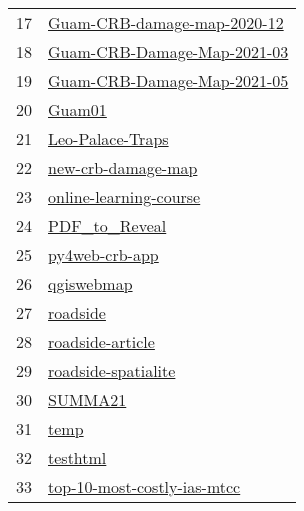 \begin{longtable}{rl}
17 &                   \href{https://github.com/aubreymoore/Guam-CRB-damage-map-2020-12}{Guam-CRB-damage-map-2020-12} \\
18 &                   \href{https://github.com/aubreymoore/Guam-CRB-Damage-Map-2021-03}{Guam-CRB-Damage-Map-2021-03} \\
19 &                   \href{https://github.com/aubreymoore/Guam-CRB-Damage-Map-2021-05}{Guam-CRB-Damage-Map-2021-05} \\
20 &                                                             \href{https://github.com/aubreymoore/Guam01}{Guam01} \\
21 &                                         \href{https://github.com/aubreymoore/Leo-Palace-Traps}{Leo-Palace-Traps} \\
22 &                                     \href{https://github.com/aubreymoore/new-crb-damage-map}{new-crb-damage-map} \\
23 &                             \href{https://github.com/aubreymoore/online-learning-course}{online-learning-course} \\
24 &                                               \href{https://github.com/aubreymoore/PDF_to_Reveal}{PDF_to_Reveal} \\
25 &                                             \href{https://github.com/aubreymoore/py4web-crb-app}{py4web-crb-app} \\
26 &                                                     \href{https://github.com/aubreymoore/qgiswebmap}{qgiswebmap} \\
27 &                                                         \href{https://github.com/aubreymoore/roadside}{roadside} \\
28 &                                         \href{https://github.com/aubreymoore/roadside-article}{roadside-article} \\
29 &                                   \href{https://github.com/aubreymoore/roadside-spatialite}{roadside-spatialite} \\
30 &                                                           \href{https://github.com/aubreymoore/SUMMA21}{SUMMA21} \\
31 &                                                                 \href{https://github.com/aubreymoore/temp}{temp} \\
32 &                                                         \href{https://github.com/aubreymoore/testhtml}{testhtml} \\
33 &                   \href{https://github.com/aubreymoore/top-10-most-costly-ias-mtcc}{top-10-most-costly-ias-mtcc} \\

\end{longtable}
